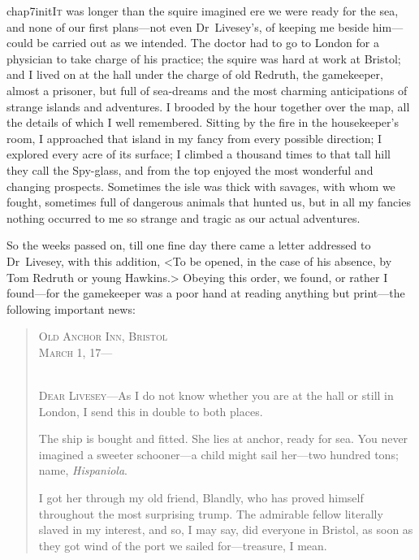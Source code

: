 
\lettrine{chap7initI}{t} was longer than the squire imagined ere we were ready for the sea, and none of our first plans—not even Dr~Livesey's, of keeping me beside him—could be carried out as we intended. The doctor had to go to London for a physician to take charge of his practice; the squire was hard at work at Bristol; and I lived on at the hall under the charge of old Redruth, the gamekeeper, almost a prisoner, but full of sea-dreams and the most charming anticipations of strange islands and adventures. I brooded by the hour together over the map, all the details of which I well remembered. Sitting by the fire in the housekeeper's room, I approached that island in my fancy from every possible direction; I explored every acre of its surface; I climbed a thousand times to that tall hill they call the Spy-glass, and from the top enjoyed the most wonderful and changing prospects. Sometimes the isle was thick with savages, with whom we fought, sometimes full of dangerous animals that hunted us, but in all my fancies nothing occurred to me so strange and tragic as our actual adventures.

So the weeks passed on, till one fine day there came a letter addressed to Dr~Livesey, with this addition, <To be opened, in the case of his absence, by Tom Redruth or young Hawkins.> Obeying this order, we found, or rather I found—for the gamekeeper was a poor hand at reading anything but print—the following important news:

\begin{quotation}
	\begin{flushright}\scshape
Old Anchor Inn, Bristol\\March 1, 17—\\
\end{flushright}
~\\
\nopagebreak
\textsc{Dear Livesey}—As I do not know whether you are at the hall or still in London, I send this in double to both places.

The ship is bought and fitted. She lies at anchor, ready for sea. You never imagined a sweeter schooner—a child might sail her—two hundred tons; name, \textit{Hispaniola}.

I got her through my old friend, Blandly, who has proved himself throughout the most surprising trump. The admirable fellow literally slaved in my interest, and so, I may say, did everyone in Bristol, as soon as they got wind of the port we sailed for—treasure, I mean.
\end{quotation}


